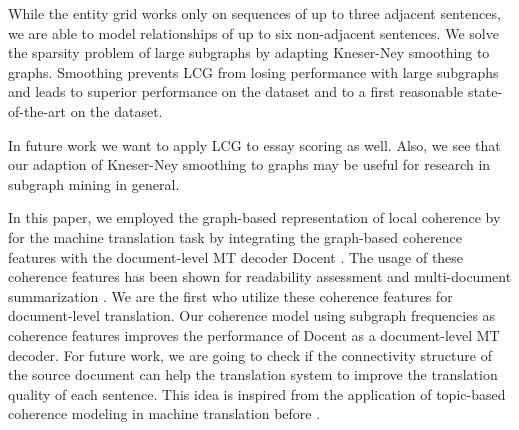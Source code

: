 While the entity grid works only on sequences of up to three adjacent
sentences, we are able to model relationships of up to six
non-adjacent sentences. We solve the sparsity problem of large
subgraphs by adapting Kneser-Ney smoothing to graphs. Smoothing
prevents LCG from losing performance with large subgraphs and leads to
superior performance on the  dataset and to a
first reasonable state-of-the-art on the  dataset.

In future work we want to apply LCG to essay scoring as well. Also, we
see that our adaption of Kneser-Ney smoothing to graphs may be useful
for research in subgraph mining in general.

In this paper, we employed the graph-based representation of local coherence by  
for the machine translation task by integrating the graph-based coherence features with the document-level MT decoder Docent \cite{Hardmeier2012a, Hardmeier2013a}. 
The usage of these coherence features has been shown for readability assessment and multi-document summarization \cite{Parveen2016,Mesgar2016}. We are the first who utilize these coherence features for document-level translation.
Our coherence model using subgraph frequencies  as coherence features improves the performance of Docent as a document-level MT decoder.
For future work, we are going to check if the connectivity structure of the source document can help the translation system to improve the translation quality of each sentence. This idea is inspired from the application of topic-based coherence modeling in machine translation before \cite{Xiong2013}.


